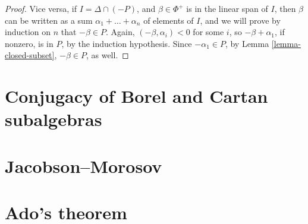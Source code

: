 \begin{proof}
 Vice versa, if $I= \Delta \cap (-P)$, and $\beta\in \Phi^+$ is in the linear span of $I$, then $\beta$ can be written as a sum $\alpha_1+\dots+\alpha_n$ of elements of $I$, and  we will prove by induction on $n$ that $-\beta\in P$. Again, $(-\beta,\alpha_i)<0$ for some $i$, so $-\beta+\alpha_1$, if nonzero, is in $P$, by the induction hypothesis. Since $-\alpha_1\in P$, by Lemma \ref{lemma-closed-subset}, $-\beta\in P$, as well.
\end{proof}




\section{Conjugacy of Borel and Cartan subalgebras}
\label{section-Borel-Cartan}


\section{Jacobson--Morosov}
\label{section-Jacobson-Morosov}

\section{Ado's theorem}
\label{section-Ado}















